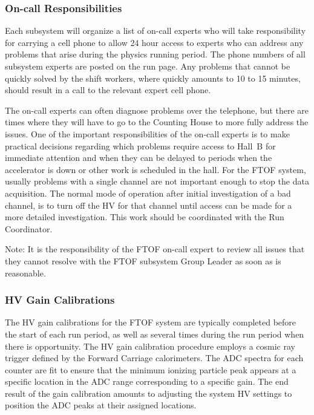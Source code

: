 \documentclass[letterpaper,10pt]{article}
\begin{document}
\subsubsection{On-call Responsibilities}
\label{oncall}

Each subsystem will organize a list of on-call experts who will take responsibility for carrying
a cell phone to allow 24 hour access to experts who can address any problems that arise during
the physics running period. The phone numbers of all subsystem experts are posted on the run page. 
Any problems that cannot be quickly solved by the shift workers, where quickly amounts to 10 to 15 
minutes, should result in a call to the relevant expert cell phone. 

The on-call experts can often diagnose problems over the telephone, but there are times where they
will have to go to the Counting House to more fully address the issues. One of the important
responsibilities of the on-call experts is to make practical decisions regarding which problems 
require access to Hall~B for immediate attention and when they can be delayed to periods when the 
accelerator is down or other work is scheduled in the hall. For the FTOF system, usually problems 
with a single channel are not important enough to stop the data acquisition. The normal mode of 
operation after initial investigation of a bad channel, is to turn off the HV for that channel 
until access can be made for a more detailed investigation. This work should be coordinated with
the Run Coordinator.

Note: It is the responsibility of the FTOF on-call expert to review all issues that they cannot
resolve with the FTOF subsystem Group Leader as soon as is reasonable.

\subsubsection{HV Gain Calibrations}
\label{gain-calib}

The HV gain calibrations for the FTOF system are typically completed before the start of each run
period, as well as several times during the run period when there is opportunity. The HV gain 
calibration procedure employs a cosmic ray trigger defined by the Forward Carriage calorimeters. 
The ADC spectra for each counter are fit to ensure that the minimum ionizing particle peak appears 
at a specific location in the ADC range corresponding to a specific gain. The end result of the 
gain calibration amounts to adjusting the system HV settings to position the ADC peaks at their 
assigned locations.
\end{document}
